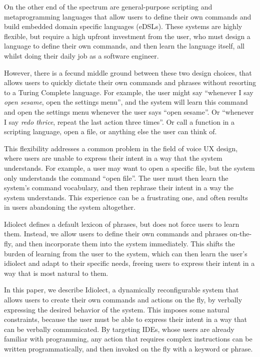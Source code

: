 \documentclass[conference]{IEEEtran}
\begin{document}
On the other end of the spectrum are general-purpose scripting and metaprogramming languages that allow users to define their own commands and build embedded domain specific languages (eDSLs). These systems are highly flexible, but require a high upfront investment from the user, who must design a language to define their own commands, and then learn the language itself, all whilst doing their daily job as a software engineer.

However, there is a fecund middle ground between these two design choices, that allows users to quickly dictate their own commands and phrases without resorting to a Turing Complete language. For example, the user might say ``whenever I say \textit{open sesame}, open the settings menu'', and the system will learn this command and open the settings menu whenever the user says ``open sesame''. Or ``whenever I say \textit{redo thrice}, repeat the last action three times''. Or call a function in a scripting language, open a file, or anything else the user can think of.

This flexibility addresses a common problem in the field of voice UX design, where users are unable to express their intent in a way that the system understands. For example, a user may want to open a specific file, but the system only understands the command ``open file''. The user must then learn the system's command vocabulary, and then rephrase their intent in a way the system understands. This experience can be a frustrating one, and often results in users abandoning the system altogether.

Idiolect defines a default lexicon of phrases, but does not force users to learn them. Instead, we allow users to define their own commands and phrases on-the-fly, and then incorporate them into the system immediately. This shifts the burden of learning from the user to the system, which can then learn the user's idiolect and adapt to their specific needs, freeing users to express their intent in a way that is most natural to them.

In this paper, we describe Idiolect, a dynamically reconfigurable system that allows users to create their own commands and actions on the fly, by verbally expressing the desired behavior of the system. This imposes some natural constraints, because the user must be able to express their intent in a way that can be verbally communicated. By targeting IDEs, whose users are already familiar with programming, any action that requires complex instructions can be written programmatically, and then invoked on the fly with a keyword or phrase.
\end{document}

